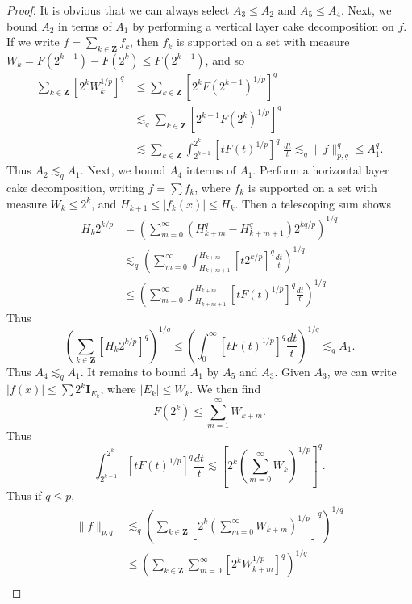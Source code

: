 \begin{proof}
    It is obvious that we can always select $A_3 \leq A_2$ and $A_5 \leq A_4$. Next, we bound $A_2$ in terms of $A_1$ by performing a vertical layer cake decomposition on $f$. If we write $f = \sum_{k \in \mathbf{Z}} f_k$, then $f_k$ is supported on a set with measure $W_k = F(2^{k-1}) - F(2^k) \leq F(2^{k-1})$, and so
    \begin{align*}
        \sum_{k \in \mathbf{Z}} [2^k W_k^{1/p}]^q &\leq \sum_{k \in \mathbf{Z}} [2^k F(2^{k-1})^{1/p}]^q\\
        &\lesssim_q \sum_{k \in \mathbf{Z}} [2^{k-1} F(2^k)^{1/p}]^q\\
        &\lesssim \sum_{k \in \mathbf{Z}} \int_{2^{k-1}}^{2^k} [tF(t)^{1/p}]^q\; \frac{dt}{t} \lesssim_q \| f \|_{p,q}^q \leq A_1^q.
    \end{align*}
    Thus $A_2 \lesssim_q A_1$. Next, we bound $A_4$ interms of $A_1$. Perform a horizontal layer cake decomposition, writing $f = \sum f_k$, where $f_k$ is supported on a set with measure $W_k \leq 2^k$, and $H_{k+1} \leq |f_k(x)| \leq H_k$. Then a telescoping sum shows
    \begin{align*}
        H_k 2^{k/p} &= \left( \sum_{m = 0}^\infty (H_{k+m}^q - H_{k+m+1}^q) 2^{kq /p} \right)^{1/q}\\
        &\lesssim_q \left( \sum_{m = 0}^\infty \int_{H_{k+m+1}}^{H_{k+m}} [t 2^{k/p}]^q \frac{dt}{t} \right)^{1/q}\\
        &\leq \left( \sum_{m = 0}^\infty \int_{H_{k+m+1}}^{H_{k+m}} [t F(t)^{1/p}]^q \frac{dt}{t} \right)^{1/q}
    \end{align*}
    Thus
    \[ \left( \sum_{k \in \mathbf{Z}} [H_k 2^{k/p}]^q \right)^{1/q} \leq \left( \int_0^\infty [t F(t)^{1/p}]^q \frac{dt}{t} \right)^{1/q} \lesssim_q A_1. \]
    Thus $A_4 \lesssim_q A_1$. It remains to bound $A_1$ by $A_5$ and $A_3$. Given $A_3$, we can write $|f(x)| \leq \sum 2^k \mathbf{I}_{E_k}$, where $|E_k| \leq W_k$. We then find
    \[ F(2^k) \leq \sum_{m = 1}^\infty W_{k+m}. \]
    Thus
    \[ \int_{2^{k-1}}^{2^k} [t F(t)^{1/p}]^q \frac{dt}{t} \lesssim \left[ 2^k \left(\sum_{m = 0}^\infty W_k \right)^{1/p} \right]^q. \]
    Thus if $q \leq p$,
    \begin{align*}
        \| f \|_{p,q} &\lesssim_q \left( \sum_{k \in \mathbf{Z}} \left[2^k \left( \sum_{m = 0}^\infty W_{k+m} \right)^{1/p} \right]^q \right)^{1/q}\\
        &\leq \left( \sum_{k \in \mathbf{Z}} \sum_{m = 0}^\infty \left[ 2^k W_{k+m}^{1/p} \right]^q \right)^{1/q}\\

\end{align*}
\end{proof}
